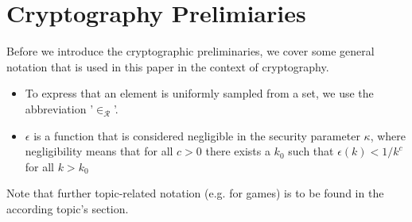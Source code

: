 \section{Cryptography Prelimiaries}

Before we introduce the cryptographic preliminaries, we cover some general notation that is used in this paper in the context of cryptography.
\begin{itemize}
    \item To express that an element is uniformly sampled from a set, we use the abbreviation '$\in_\mathcal{R}$'. 
    \item $\epsilon$ is a function that is considered negligible in the security parameter $\kappa$, 
    where negligibility means that for all $c>0$ there exists a $k_0$ such that $\epsilon(k) < 1/k^c$ for all $k > k_0$
\end{itemize}

Note that further topic-related notation (e.g. for games) is to be found in the according topic's section.

